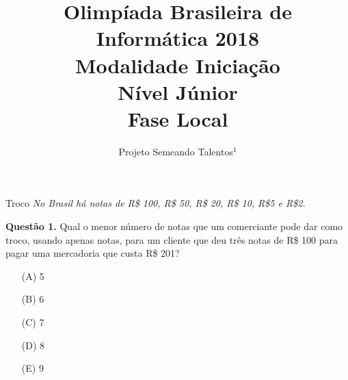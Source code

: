 \documentclass{beamer}
\title {Olimpíada Brasileira de Informática 2018 \\Modalidade Iniciação \\ Nível Júnior \\ Fase Local}
\author[Projeto Semeando Talentos]{ Projeto Semeando Talentos$^{1}$  }
\institute[UFC]{$^{1}$Universidade Federal do Ceará - Campus de Quixadá\\}
\date{}
\begin{document}
\begin{frame}
	\titlepage
\end{frame}


\begin{frame}{Troco}
\textit{No Brasil há notas de R\$ 100, R\$ 50, R\$ 20, R\$ 10, R\$5 e R\$2.}



\textbf{Questão 1.} Qual o menor número de notas que um comerciante pode dar como troco, usando apenas notas, para um cliente que deu três notas de R\$ 100 para pagar uma mercadoria que custa R\$ 201?
\begin{enumerate}
 \item[(A)] 5
 \item[(B)] 6
 \item[(C)] 7
 \item[(D)] 8
 \item[(E)] 9
\end{enumerate}

\end{frame}
\end{document}
